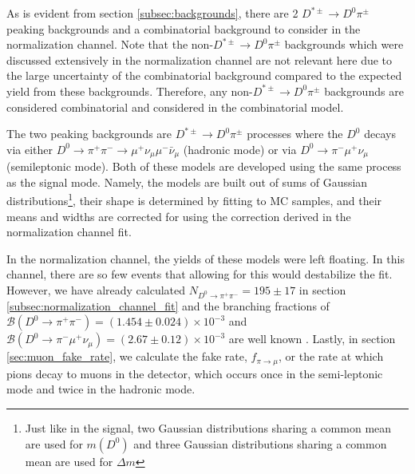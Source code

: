 As is evident from section \ref{subsec:backgrounds}, there are 2 $D^{*\pm} \to D^0 \pi^\pm$ peaking backgrounds and a combinatorial background to consider in the normalization channel. Note that the non-$D^{*\pm} \to D^0 \pi^\pm$ backgrounds which were discussed extensively in the normalization channel are not relevant here due to the large uncertainty of the combinatorial background compared to the expected yield from these backgrounds. Therefore, any non-$D^{*\pm} \to D^0 \pi^\pm$ backgrounds are considered combinatorial and considered in the combinatorial model.

The two peaking backgrounds are $D^{*\pm} \to D^0 \pi^\pm$ processes where the $D^0$ decays via either $D^0 \to \pi^+ \pi^- \to \mu^+ \nu_\mu \mu^- \bar{\nu}_\mu$ (hadronic mode) or via $D^0 \to \pi^- \mu^+ \nu_\mu$ (semileptonic mode). Both of these models are developed using the same process as the signal mode. Namely, the models are built out of sums of Gaussian distributions\footnote{Just like in the signal, two Gaussian distributions sharing a common mean are used for $m(D^0)$ and three Gaussian distributions sharing a common mean are used for $\Delta m$}, their shape is determined by fitting to MC samples, and their means and widths are corrected for using the correction derived in the normalization channel fit. 

In the normalization channel, the yields of these models were left floating. In this channel, there are so few events that allowing for this would destabilize the fit. However, we have already calculated $N_{D^0 \to \pi^+ \pi^-} = 195 \pm 17$ in section \ref{subsec:normalization_channel_fit} and the branching fractions of $\mathcal{B}(D^0 \to \pi^+ \pi^-) = (1.454 \pm 0.024) \times 10^{-3}$ and $\mathcal{B}(D^0 \to \pi^-\mu^+ \nu_\mu) = (2.67 \pm 0.12) \times 10^{-3}$ are well known \cite{ref:pdg2024}. Lastly, in section \ref{sec:muon_fake_rate}, we calculate the fake rate, $f_{\pi \to \mu}$, or the rate at which pions decay to muons in the detector, which occurs once in the semi-leptonic mode and twice in the hadronic mode.

